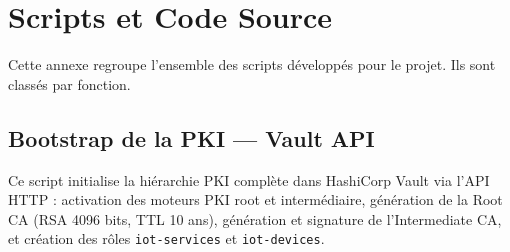 ﻿\chapter{Scripts et Code Source}
\label{annexe:scripts}

Cette annexe regroupe l'ensemble des scripts développés pour le projet. Ils sont classés par fonction.

\section{Bootstrap de la PKI --- Vault API}
\label{sec:script_pki}

Ce script initialise la hiérarchie PKI complète dans HashiCorp Vault via l'API HTTP : activation des moteurs PKI root et intermédiaire, génération de la Root CA (RSA 4096 bits, TTL 10 ans), génération et signature de l'Intermediate CA, et création des rôles \texttt{iot-services} et \texttt{iot-devices}.

